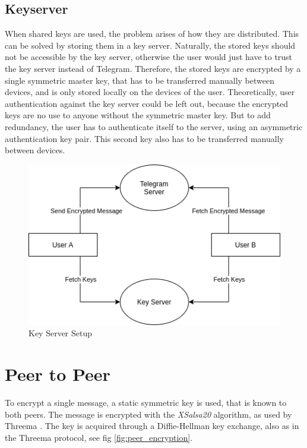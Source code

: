 \documentclass[a4paper, oneside]{discothesis}
\begin{document}
\subsection{Keyserver}

When shared keys are used, the problem arises of how they are distributed. This can be solved by storing them in a key server. Naturally, the stored keys should not be accessible by the key server, otherwise the user would just have to trust the key server instead of Telegram. Therefore, the stored keys are encrypted by a single symmetric master key, that has to be transferred manually between devices, and is only stored locally on the devices of the user. Theoretically, user authentication against the key server could be left out, because the encrypted keys are no use to anyone without the symmetric master key. But to add redundancy, the user has to authenticate itself to the server, using an asymmetric authentication key pair. This second key also has to be transferred manually between devices.


\begin{figure}[h!]
    \centering
    \includegraphics[width=\columnwidth]{figures/structure.png}
    \caption{Key Server Setup}
    \label{fig:structure}
\end{figure}




\section{Peer to Peer}
To encrypt a single message, a static symmetric key is used, that is known to both peers. The message is encrypted with the \emph{XSalsa20} algorithm, as used by Threema \cite{Threema}. The key is acquired through a Diffie-Hellman key exchange, also as in the Threema protocol, see fig \ref{fig:peer_encryption}.
\end{document}
